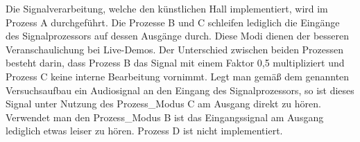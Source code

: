 \documentclass[a4paper,12pt,fontsize=12,DIV=12]{scrartcl}
\begin{document}
Die Signalverarbeitung, welche den künstlichen Hall implementiert, wird im Prozess A durchgeführt. Die Prozesse B und C schleifen lediglich die Eingänge des Signalprozessors auf dessen Ausgänge durch. Diese Modi dienen der besseren Veranschaulichung bei Live-Demos.  Der Unterschied zwischen beiden Prozessen besteht darin, dass Prozess B das Signal mit einem Faktor 0,5 multipliziert und Prozess C keine interne Bearbeitung vornimmt. Legt man gemäß dem genannten Versuchsaufbau ein Audiosignal an den Eingang des Signalprozessors, so ist dieses Signal unter Nutzung des Prozess\_Modus C am Ausgang direkt zu hören. Verwendet man den Prozess\_Modus B ist das Eingangssignal am Ausgang lediglich etwas leiser zu hören. Prozess D ist nicht implementiert.

\newpage

\end{document}
